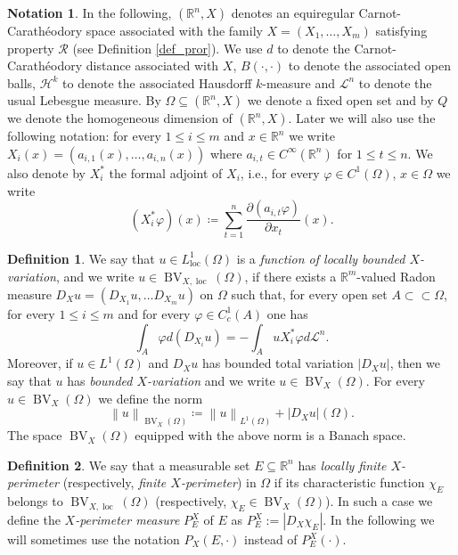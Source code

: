 \documentclass[12pt,a4paper]{amsart}
\theoremstyle{definition}
\newtheorem{defi}{Definition}[section]
\newtheorem*{notation}{Notation}
\theoremstyle{plain}
\newcommand{\vp}{\varphi}
\newcommand{\R}{\mathbb{R}}
\newcommand{\pp}{\partial}
\newcommand{\se}{\subseteq}
\newcommand{\ceq}{\coloneqq}
\newcommand{\leb}{\mathcal{L}}
\newcommand{\bv}{\operatorname{BV}}
\newcommand{\hau}{\mathcal{H}}
\newcommand{\nl}{\left\|}
\newcommand{\nr}{\right\|}
\newcommand{\loc}{\operatorname{loc}}
\begin{document}
\begin{notation}
 In the following, $(\R^n,X)$ denotes an equiregular Carnot-Carathéodory space associated with the family $X=(X_1,\dots,X_m)$ satisfying property $\mathcal R$ (see Definition \ref{def_pror}). We use $d$ to denote the Carnot-Carathéodory distance associated with $X$, $B(\cdot,\cdot)$ to denote the associated open balls, $\hau^k$ to denote the associated Hausdorff $k$-measure and  $\leb^n$ to denote the usual Lebesgue measure. By $\Omega \se (\R^n,X)$ we denote a fixed open set and by $Q$ we denote the homogeneous dimension of $(\R^n,X)$. Later we will also use the following notation: for every $1 \leq i \leq m$ and $x \in \R^n$ we write $X_i(x)=(a_{i,1}(x),\dots,a_{i,n}(x))$ where $a_{i,t} \in C^\infty(\R^n)$ for $1 \leq t \leq n$. We also denote by $X_i^*$ the formal adjoint of $X_i$, i.e., for every $\vp \in C^1(\Omega)$, $x \in \Omega$ we write
\[
(X_i^*\vp)(x) \ceq \sum_{t=1}^n \frac{\pp (a_{i,t}\vp)}{\pp x_t}(x).
\]
\end{notation}
\begin{defi}\label{def_bvx}
We say that $u \in L^1_{\loc}(\Omega)$ is a \emph{function of locally bounded $X$-variation}, and we write $u \in \bv_{X,\loc}(\Omega)$, if there exists a $\R^m$-valued Radon measure $D_X u=(D_{X_1}u,\dots D_{X_m}u)$ on $\Omega$ such that, for every open set $A \subset \subset \Omega$, for every $1 \leq i \leq m$ and for every $\vp \in C^1_c(A)$ one has 
\[
\int_A \vp d(D_{X_i}u)=-\int_A u X_i^*\vp d \leb^n.
 \]
Moreover, if $u \in L^1(\Omega)$ and $D_X u$ has bounded total variation $|D_X u|$, then we say that $u$ has \emph{bounded $X$-variation} and we write $u \in \bv_X(\Omega)$. For every $u \in \bv_X(\Omega)$ we define the norm
\[
\nl u \nr_{\bv_X(\Omega)} \ceq \nl u \nr_{L^1(\Omega)}+|D_Xu|(\Omega).
\]
The space $\bv_X(\Omega)$ equipped with the above norm is a Banach space.
\end{defi}

\begin{defi}\label{def_xper}
    We say that a measurable set  $E \se \R^n$ has \emph{locally finite $X$-perimeter} (respectively, \emph{finite $X$-perimeter}) in $\Omega$ if its characteristic function $\chi_E$ belongs to $\bv_{X,\loc}(\Omega)$ (respectively, $\chi_E \in \bv_X(\Omega)$). 
    In such a case we define the \emph{$X$-perimeter measure} $P^X_E$ of $E$ as $P^X_E:=|D_X \chi_E|$. In the following we will sometimes use the notation $P_X(E,\cdot)$ instead of $P^X_E(\cdot)$.
\end{defi}
\end{document}
